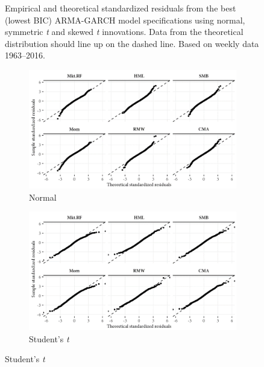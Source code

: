 
\begin{figure}[tp]
  \centering
  \footnotesize

  \caption{QQ Plots of Standardized Residuals of ARMA-GARCH Models}

  \begin{longcaption}
    Empirical and theoretical standardized residuals from the best (lowest BIC) ARMA-GARCH model specifications using normal, symmetric \emph{t} and skewed \emph{t} innovations. Data from the theoretical distribution should line up on the dashed line. Based on weekly data 1963--2016.
  \end{longcaption}

  \begin{subfigure}{0.70\textwidth}
    \includegraphics[width=\textwidth]{graphics/qq_norm.png}
    \caption{Normal}
  \end{subfigure}
  \begin{subfigure}{0.70\textwidth}
    \includegraphics[width=\textwidth]{graphics/qq_std.png}
    \caption{Student's \textit{t}}

\end{subfigure}
\end{figure}
